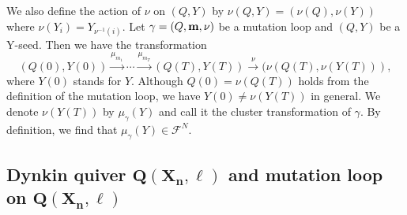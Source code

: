 \documentclass[10pt,a4paper]{amsart}
\numberwithin{equation}{section}
\begin{document}
We also define the action of $\nu$ on $(Q,Y)$ by $\nu(Q,Y)=(\nu(Q),\nu(Y))$ where $\nu(Y_i)=Y_{\nu^{-1}(i)}$.
Let $\gamma=(Q,{\bf m},\nu)$ be a mutation loop and $(Q,Y)$ be a Y-seed.
Then we have the transformation
\[(Q(0),Y(0))\overset{\mu_{m_1}}{\longrightarrow}\cdots\overset{\mu_{m_T}}{\longrightarrow}(Q(T),Y(T))\overset{\nu}{\longrightarrow}(\nu(Q(T),\nu(Y(T))),\]
where $Y(0)$ stands for $Y$.
Although $Q(0)=\nu(Q(T))$ holds from the definition of the mutation loop, we have $Y(0)\neq\nu(Y(T))$ in general.
We denote $\nu(Y(T))$ by $\mu_\gamma(Y)$ and call it the cluster transformation of $\gamma$.
By definition, we find that $\mu_\gamma(Y)\in\mathcal{F}^N$.

	\subsection[Dynkin quiver Q(X\_n,ell) and mutation loop on Q(X\_n,ell)]{Dynkin quiver $\boldsymbol{Q(X_n,\ell)}$ and mutation loop on $\boldsymbol{Q(X_n,\ell)}$}
\end{document}
